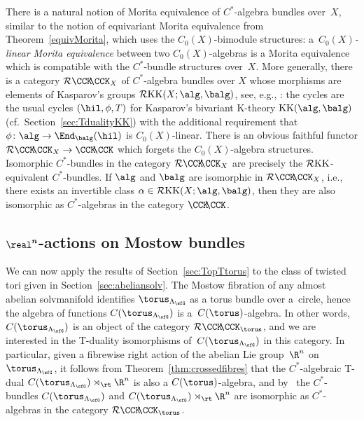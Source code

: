 \begin{Remark}\label{rem:MoritaRKK}
There is a natural notion of Morita equivalence of $C^*$-algebra bundles over~$X$, similar to the notion of
equivariant Morita equivalence from Theorem~\ref{equivMorita}, which
uses the $C_0(X)$-bimodule structures: a~\emph{$C_0(X)$-linear Morita equivalence} between two
$C_0(X)$-algebras is a Morita equivalence which is compatible with the
$C^*$-bundle structures over~$X$. More generally, there is a category
$\mathcal{R}\CCK\hspace{-1mm}\CCK_X$ of $C^*$-algebra bundles over $X$ whose morphisms are
elements of Kasparov's groups $\mathcal{R}{\rm KK}(X;\alg,\balg)$, see, e.g., \cite{Echterhoff2009}: the cycles are the usual cycles
$(\hil,\phi,T)$ for Kasparov's bivariant K-theory ${\rm
 KK}(\alg,\balg)$ (cf.\ Section~\ref{sec:TdualityKK}) with the
additional requirement that $\phi\colon \alg\to\End_\balg(\hil)$ is
$C_0(X)$-linear. There is an obvious faithful functor
$\mathcal{R}\CCK\hspace{-1mm}\CCK_X \to \CCK\hspace{-1mm}\CCK$ which forgets the
$C_0(X)$-algebra structures. Isomorphic $C^*$-bundles in the category
$\mathcal{R}\CCK\hspace{-1mm}\CCK_X$ are precisely the $\mathcal{R}{\rm KK}$-equivalent
$C^*$-bundles. If $\alg$ and $\balg$ are isomorphic in
$\mathcal{R}\CCK\hspace{-1mm}\CCK_X$, i.e., there exists an invertible class
$\alpha\in \mathcal{R}{\rm KK}(X;\alg,\balg)$, then they are also
isomorphic as
$C^*$-algebras in the category $\CCK\hspace{-1mm}\CCK$.
\end{Remark}

\subsection[$\real^n$-actions on Mostow bundles]{$\boldsymbol{\real^n}$-actions on Mostow bundles}\label{sec:RMostow}

We can now apply the results of Section~\ref{sec:TopTtorus} to the
class of twisted tori given in
Section~\ref{sec:abeliansolv}.
The Mostow fibration of any almost abelian solvmanifold identifies
$\torus_{\Lambda_\sfG}$ as a torus bundle over a~circle, hence the
algebra of functions $C(\torus_{\Lambda_\sfG})$ is a~$C(\torus)$-algebra. In other words, $C(\torus_{\Lambda_\sfG})$ is an
object of the category $\mathcal{R}\CCK\hspace{-1mm}\CCK_\torus$, and we are
interested in the T-duality isomorphisms of~$C(\torus_{\Lambda_\sfG})$
in this category. In particular, given a fibrewise right action of the abelian
Lie group~$\R^n$ on~$\torus_{\Lambda_\sfG}$, it follows from
Theorem~\ref{thm:crossedfibres} that the $C^*$-algebraic T-dual
$C(\torus_{\Lambda_\sfG})\rtimes_\rt\R^n$ is also a $C(\torus)$-algebra, and by~\cite[Theorem~3.5]{Echterhoff2009} the $C^*$-bundles
$C(\torus_{\Lambda_\sfG})$ and
$C(\torus_{\Lambda_\sfG})\rtimes_\rt\R^n$ are isomorphic as $C^*$-algebras in the
category $\mathcal{R}\CCK\hspace{-1mm}\CCK_\torus$.

